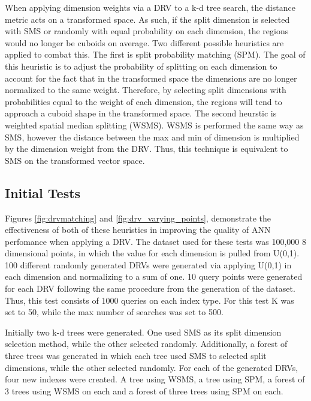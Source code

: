 When applying dimension weights via a DRV to a k-d tree search, the distance metric acts on a transformed space.  As such, if the split dimension is selected with SMS or randomly with equal probability on each dimension, the regions would no longer be cuboids on average.  Two different possible heuristics are applied to combat this.  The first is split probability matching (SPM).  The goal of this heuristic is to adjust the probability of splitting on each dimension to account for the fact that in the transformed space the dimensions are no longer normalized to the same weight.  Therefore, by selecting split dimensions with probabilities equal to the weight of each dimension, the regions will tend to approach a cuboid shape in the transformed space.  The second heurstic is weighted spatial median splitting (WSMS).  WSMS is performed the same way as SMS, however the distance between the max and min of dimension is multiplied by the dimension weight from the DRV.  Thus, this technique is equivalent to SMS on the transformed vector space.

\subsection{Initial Tests}
\label{sec:inittest}

Figures \ref{fig:drvmatching} and \ref{fig:drv_varying_points}, demonstrate the effectiveness of both of these heuristics in improving the quality of ANN perfomance when applying a DRV.  The dataset used for these tests was 100,000 8 dimensional points, in which the value for each dimension is pulled from U(0,1).  100 different randomly generated DRVs were generated via applying U(0,1) in each dimension and normalizing to a sum of one.  10 query points were generated for each DRV following the same procedure from the generation of the dataset.  Thus, this test consists of 1000 queries on each index type.  For this test K was set to 50, while the max number of searches was set to 500.

Initially two k-d trees were generated.  One used SMS as its split dimension selection method, while the other selected randomly.  Additionally, a forest of three trees was generated in which each tree used SMS to selected split dimensions, while the other selected randomly.  For each of the generated DRVs, four new indexes were created.  A tree using WSMS, a tree using SPM, a forest of 3 trees using WSMS on each and a forest of three trees using SPM on each.

